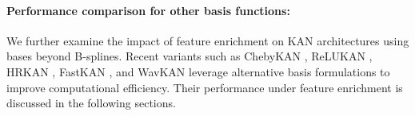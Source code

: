 \documentclass{article}
\begin{document}
\paragraph{Performance comparison for other basis functions:}
\label{subsubsec:func_appr_others}
We further examine the impact of feature enrichment on KAN architectures using bases beyond B-splines. Recent variants such as ChebyKAN \cite{ss2024chebyshev}, ReLUKAN \cite{qiu2024relu}, HRKAN \cite{so2025higher}, FastKAN \cite{li2024kolmogorov}, and WavKAN \cite{bozorgasl2405wav} leverage alternative basis formulations to improve computational efficiency. Their performance under feature enrichment is discussed in the following sections.
\end{document}
